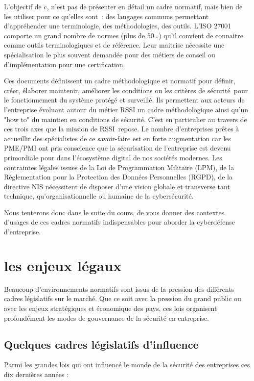 \begin{nota}
L’objectif de c\edoc, n’est pas de présenter en détail un cadre normatif, mais bien de les utiliser pour ce qu’elles sont : des langages communs permettant d’appréhender une terminologie, des méthodologies, des outils. L’ISO 27001 comporte un grand nombre de normes (plus de 50…) qu’il convient de connaitre comme outils terminologiques et de référence. Leur maitrise nécessite une spécialisation le plus souvent demandée pour des métiers de conseil ou d’implémentation pour une certification.
\end{nota}

Ces documents définissent un cadre méthodologique et normatif pour définir, créer, élaborer maintenir, améliorer les conditions ou les critères de sécurité pour le fonctionnement du système protégé et surveillé. 
Ils permettent aux acteurs de l'entreprise évoluant autour du métier RSSI un cadre méthodologique ainsi qu’un "how to" du maintien en conditions de sécurité. C’est en particulier au travers de ces trois axes que la mission de RSSI repose. 
Le nombre d’entreprises prêtes à accueillir des spécialistes de ce savoir-faire est en forte augmentation car les PME/PMI ont pris conscience que la sécurisation de l’entreprise est devenu primordiale pour  dans l’écosystème digital de nos sociétés modernes. Les contraintes légales issues de la Loi de Programmation Militaire (LPM), de la Règlementation pour la Protection des Données Personnelles (RGPD), de la directive NIS nécessitent de disposer d’une vision globale et transverse tant technique, qu'organisationnelle ou humaine de la cybersécurité.

Nous tenterons donc dans le suite du cours, de vous donner des contextes d'usages de ces cadres normatifs indispensables pour aborder la cyberdéfense d’entreprise. 

\section{les enjeux légaux}

Beaucoup d'environnements normatifs sont issus de la pression des différents cadres législatifs sur le marché. Que ce soit avec la pression du grand public ou avec les enjeux stratégiques et économique des pays, ces lois organisent profondément les modes de gouvernance de la sécurité en entreprise.

\subsection{Quelques cadres législatifs d'influence}
Parmi les grandes lois qui ont influencé  le monde de la sécurité des entreprises ces dix dernières années :

